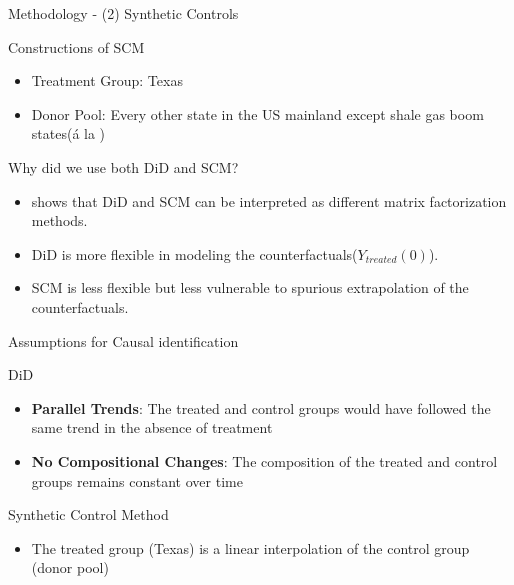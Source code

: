\documentclass[aspectratio=169,xcolor=dvipsnames]{beamer}
\newenvironment{wideitemize}{\itemize\addtolength{\itemsep}{10pt}}{\enditemize}
\begin{document}
\begin{frame}{Methodology - (2) Synthetic Controls}
\begin{wideitemize}
    \item Constructions of SCM
    \begin{itemize}
        \item Treatment Group: Texas
        \item Donor Pool: Every other state in the US mainland except shale gas boom states(á la \cite{cunningham2019})
    \end{itemize}
    \item Why did we use both DiD and SCM?
    \begin{itemize}
        \item \textcite{athey2021matrix} shows that DiD and SCM can be interpreted as different matrix factorization methods.
        \item DiD is more flexible in modeling the counterfactuals($Y_{treated}(0)$).
        \item SCM is less flexible but less vulnerable to spurious extrapolation of the counterfactuals.
    \end{itemize}
\end{wideitemize}
\end{frame}
\begin{frame}{Assumptions for Causal identification}
\begin{wideitemize}
    \item \textcite{sun_estimating_2021} DiD
    \begin{itemize}
        \item \textbf{Parallel Trends}: The treated and control groups would have followed the same trend in the absence of treatment
        \item \textbf{No Compositional Changes}: The composition of the treated and control groups remains constant over time
    \end{itemize}
    \item Synthetic Control Method
    \begin{itemize}
        \item The treated group (Texas) is a linear interpolation of the control group (donor pool)
    \end{itemize}
\end{wideitemize}
\end{frame}
\end{document}
